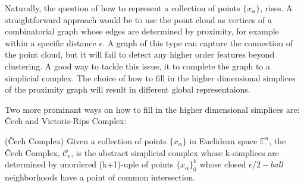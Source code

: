 \documentclass[11pt,a4paper]{report}
\begin{document}
              Naturally, the question of how to represent a collection of points $\{x_\alpha\}$, rises. 
              A straightforward approach would be to use the point cloud as vertices of a combinatorial graph whose
              edges are determined by proximity, for example within a specific distance $\epsilon$. A graph of this type can capture the connection of the point cloud,
              but it will fail to detect any higher order features beyond clustering. 
              A good way to tackle this issue, it to complete the graph to a simplicial complex. The choice of how to fill in the higher dimensional simplices of the proximity graph will result in different global representaions. 
              
              Two more prominant ways on how to fill in the higher dimensional simplices are:  \v{C}ech and Vietoris-Rips Complex: 
              
              \begin{defn} \label{cech} (\v{C}ech Complex)
           Given a collection of points $\{x_\alpha\}$ in Euclidean space $\mathbb{E}^n$, the \v{C}ech Complex, $\mathcal{C}_\epsilon$, is the abstract simplicial complex whose k-simplices are determined by unordered (k+1)-uple of points $\{x_\alpha\}_0^k$ whose closed $\epsilon/2-ball$ neighborhoods have a point of common intersection. 
              \end{defn}
           
\end{document}
